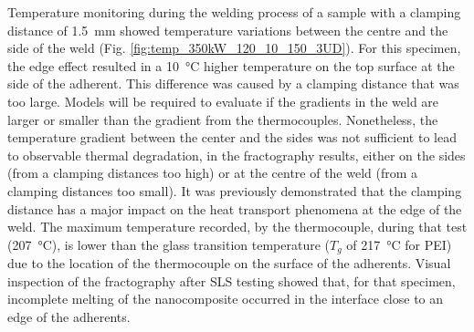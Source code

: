 \documentclass[11pt,review,times]{elsarticle}
\begin{document}
Temperature monitoring during the welding process of a sample with a clamping distance of \SI{1.5}{\mm} showed temperature variations between the centre and the side of the weld (Fig. \ref{fig:temp_350kW_120_10_150_3UD}).
For this specimen, the edge effect resulted in a \SI{10}{\celsius} higher temperature on the top surface at the side of the adherent. 
This difference was caused by a clamping distance that was too large. 
Models will be required to evaluate if the gradients in the weld are larger or smaller than the gradient from the thermocouples. 
Nonetheless, the temperature gradient between the center and the sides was not sufficient to lead to observable thermal degradation, in the fractography results, either on the sides (from a clamping distances too high) or at the centre of the weld (from a clamping distances too small). 
It was previously demonstrated that the clamping distance has a major impact on the heat transport phenomena at the edge of the weld.
The maximum temperature recorded, by the thermocouple, during that test (\SI{207}{\celsius}), is lower than the glass transition temperature ($T_g$ of \SI{217}{\celsius} for PEI) due to the location of the thermocouple on the surface of the adherents. 
Visual inspection of the fractography after SLS testing showed that, for that specimen, incomplete melting of the nanocomposite occurred in the interface close to an edge of the adherents. 
\end{document}
